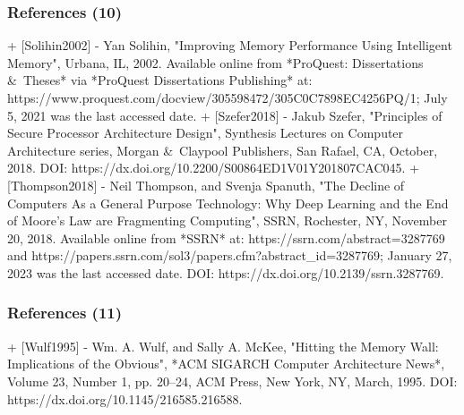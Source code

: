 \documentclass[xcolor={usenames,dvipsnames},hyperref={hyperindex,bookmarks}]{beamer}
\begin{document}
\begin{frame}
	\frametitle{References (10)}

+ [Solihin2002]
	- Yan Solihin, "Improving Memory Performance Using Intelligent Memory", Urbana, {IL}, 2002. Available online from *{ProQuest}: Dissertations {\rm \&}\ Theses* via *{ProQuest} Dissertations Publishing* at: https://www.proquest.com/docview/305598472/305C0C7898EC4256PQ/1; July 5, 2021 was the last accessed date.
+ [Szefer2018]
	- Jakub Szefer, "Principles of Secure Processor Architecture Design", Synthesis Lectures on Computer Architecture series, Morgan {\rm \&}\ Claypool Publishers, San Rafael, {CA}, October, 2018. DOI: https://dx.doi.org/10.2200/S00864ED1V01Y201807CAC045.
+ [Thompson2018]
	- Neil Thompson, and Svenja Spanuth, "The Decline of Computers As a General Purpose Technology: Why Deep Learning and the End of Moore's Law are Fragmenting Computing", {SSRN}, Rochester, {NY}, November 20, 2018. Available online from *SSRN* at: https://ssrn.com/abstract=3287769 and https://papers.ssrn.com/sol3/papers.cfm?abstract_id=3287769; January 27, 2023 was the last accessed date. DOI: https://dx.doi.org/10.2139/ssrn.3287769.


\end{frame}




















\begin{frame}
	\frametitle{References (11)}

+ [Wulf1995]
	- Wm. A. Wulf, and Sally A. {McKee}, "Hitting the Memory Wall: Implications of the Obvious", *{ACM SIGARCH} Computer Architecture News*, Volume 23, Number 1, pp. 20--24, {ACM} Press, New York, {NY}, March, 1995. DOI: https://dx.doi.org/10.1145/216585.216588.


\end{frame}























%		
%		
\end{document}

